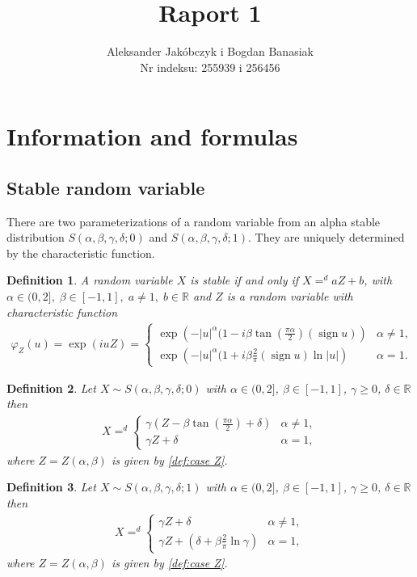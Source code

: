 \documentclass{article}
\title{Raport 1}
\author{Aleksander Jakóbczyk i Bogdan Banasiak\\ 
	Nr indeksu: 255939 i 256456}
\date{}\date{}
\newtheorem{definition}{Definition}
\DeclareMathOperator{\sign}{sign}
\begin{document}
	
	\maketitle
	\section{Information and formulas}
		\subsection*{Stable random variable}
		There are two parameterizations of a random variable from an alpha stable distribution $S(\alpha, \beta , \gamma, \delta; 0)$ and $S(\alpha, \beta , \gamma, \delta; 1)$.
		They are uniquely determined by the characteristic function.
		\begin{definition} A random variable $X$ is stable if and only if $X=^d aZ +b$, with \\$\alpha \in (0,2],\;\beta\in [-1,1],\; a\ne1,\; b\in\mathbb{R}$ and $Z$ is a random variable with characteristic function  
			\begin{gather}
				\varphi_Z(u) = \exp(i u Z) =
				\begin{cases}\label{def:case Z}
					\exp\left(- |u|^\alpha(1-i\beta\tan(\frac{\pi\alpha}{2})(\sign u)  \right) &\alpha \ne 1,\\
					\exp\left(- |u|^\alpha(1+i\beta\frac{2}{\pi}(\sign u)\ln|u|  \right) &\alpha = 1.
				\end{cases}
			\end{gather}
		\end{definition}
		\begin{definition} Let $X \sim S(\alpha, \beta , \gamma, \delta; 0)$ with $\alpha \in (0,2]$, $\beta \in [-1,1]$, $\gamma \ge 0$, $\delta\in\mathbb{R}$ then  
			\begin{gather*}
				X =^d 
				\begin{cases}
					\gamma (Z- \beta\tan(\frac{\pi\alpha}{2})+\delta)& \alpha\ne1,\\
					\gamma Z + \delta& \alpha=1,
				\end{cases}
			\end{gather*}
			where $Z = Z(\alpha,\beta)$ is given by \ref{def:case Z}.
		\end{definition}

		\begin{definition} Let $X \sim S(\alpha, \beta , \gamma, \delta; 1)$ with $\alpha \in (0,2]$, $\beta \in [-1,1]$, $\gamma \ge 0$, $\delta\in\mathbb{R}$ then  
			\begin{gather*}
				X =^d 
				\begin{cases}
					\gamma Z + \delta & \alpha \ne 1,\\
					\gamma Z + (\delta + \beta\frac{2}{\pi}\ln\gamma)& \alpha = 1,
				\end{cases}
			\end{gather*}
			where $Z = Z(\alpha,\beta)$ is given by \ref{def:case Z}.
		\end{definition}
\end{document}
